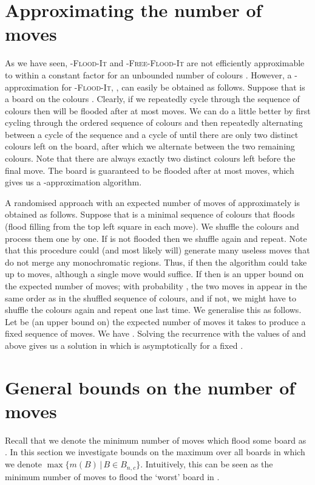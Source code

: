 \documentclass[a4paper,11pt]{llncs}
\newcounter{l}
\newcommand{\Coloroid}[1]{-\textsc{Flood-It}}
\newcommand{\ColoroidFree}[1]{-\textsc{Free-Flood-It}}
\newcommand{\Mnc}{\ensuremath{\max\{m(B)\,|\,B \in B_{n,c}\}}}
\begin{document}
\section{Approximating the number of moves} \label{sec:approx}
As we have seen, \Coloroid{c} and \ColoroidFree{c} are not efficiently approximable to within a constant factor for an unbounded number of colours . However, a -approximation for \Coloroid{c}, , can easily be obtained as follows. Suppose that  is a board on the colours . Clearly, if we repeatedly cycle through the sequence of colours   then  will be flooded after at most  moves. We can do a little better by first cycling through the ordered sequence of colours  and then repeatedly alternating between a cycle of the sequence  and a cycle of  until there are only two distinct colours left on the board, after which we alternate between the two remaining colours. Note that there are always exactly two distinct colours left before the final move. The board  is guaranteed to be flooded after at most  moves, which gives us a -approximation algorithm.

A randomised approach with an expected number of moves of approximately  is obtained as follows. Suppose that  is a minimal sequence of colours that floods  (flood filling from the top left square in each move). We shuffle the  colours and process them one by one. If  is not flooded then we shuffle again and repeat. Note that this procedure could (and most likely will) generate many useless moves that do not merge any monochromatic regions. Thus, if  then the algorithm could take up to  moves, although a single move would suffice. If  then  is an upper bound on the expected number of moves; with probability , the two moves in  appear in the same order as in the shuffled sequence of colours, and if not, we might have to shuffle the colours again and repeat one last time. We generalise this as follows. Let  be (an upper bound on) the expected number of moves it takes to produce a fixed sequence of  moves. We have . Solving the recurrence with the values of  and  above gives us a solution in which  is asymptotically  for a fixed .



\section{General bounds on the number of moves} \label{sec:bound}
Recall that we denote the minimum number of moves which flood some board  as . In this section we investigate bounds on the maximum  over all boards in  which we denote \Mnc{}. Intuitively, this can be seen as the minimum number of moves to flood the `worst' board in .
\end{document}
